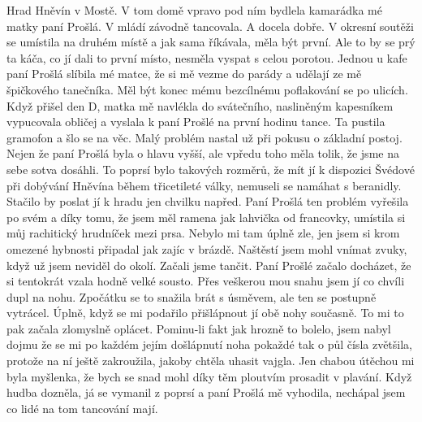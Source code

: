 
Hrad Hněvín v Mostě. V tom domě vpravo pod ním bydlela kamarádka mé
matky paní Prošlá. V mládí závodně tancovala. A docela dobře. V
okresní soutěži se umístila na druhém místě a jak sama říkávala, měla
být první. Ale to by se prý ta káča, co jí dali to první místo,
nesměla vyspat s celou porotou. Jednou u kafe paní Prošlá slíbila mé
matce, že si mě vezme do parády a udělají ze mě špičkového tanečníka.
Měl být konec mému bezcílnému poflakování se po ulicích. Když přišel
den D, matka mě navlékla do svátečního, nasliněným kapesníkem
vypucovala obličej a vyslala k paní Prošlé na první hodinu tance. Ta
pustila gramofon a šlo se na věc. Malý problém nastal už při pokusu o
základní postoj. Nejen že paní Prošlá byla o hlavu vyšší, ale vpředu
toho měla tolik, že jsme na sebe sotva dosáhli. To poprsí bylo
takových rozměrů, že mít jí k dispozici Švédové při dobývání Hněvína
během třicetileté války, nemuseli se namáhat s beranidly. Stačilo by
poslat jí k hradu jen chvilku napřed. Paní Prošlá ten problém vyřešila
po svém a díky tomu, že jsem měl ramena jak lahvička od francovky,
umístila si můj rachitický hrudníček mezi prsa. Nebylo mi tam úplně
zle, jen jsem si krom omezené hybnosti připadal jak zajíc v brázdě.
Naštěstí jsem mohl vnímat zvuky, když už jsem neviděl do okolí. Začali
jsme tančit. Paní Prošlé začalo docházet, že si tentokrát vzala hodně
velké sousto. Přes veškerou mou snahu jsem jí co chvíli dupl na nohu.
Zpočátku se to snažila brát s úsměvem, ale ten se postupně vytrácel.
Úplně, když se mi podařilo přišlápnout jí obě nohy současně. To mi to
pak začala zlomyslně oplácet. Pominu-li fakt jak hrozně to bolelo,
jsem nabyl dojmu že se mi po každém jejím došlápnutí noha pokaždé tak
o půl čísla zvětšila, protože na ní ještě zakroužila, jakoby chtěla
uhasit vajgla. Jen chabou útěchou mi byla myšlenka, že bych se snad
mohl díky těm ploutvím prosadit v plavání. Když hudba dozněla, já se
vymanil z poprsí a paní Prošlá mě vyhodila, nechápal jsem co lidé na
tom tancování mají.
